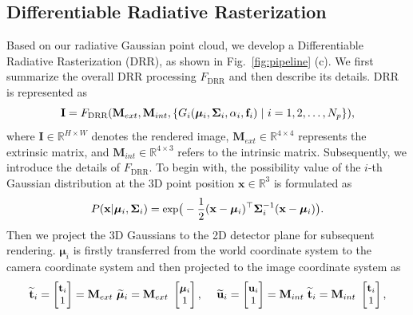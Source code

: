 \documentclass[runningheads]{llncs}
\begin{document}
\subsection{Differentiable Radiative Rasterization}
\vspace{-1mm}
Based on our radiative Gaussian point cloud, we develop a Differentiable Radiative Rasterization (DRR), as shown in Fig.~\ref{fig:pipeline} (c). We first summarize the overall DRR processing $F_{\text{DRR}}$ and then describe its details. DRR is represented as
\vspace{-0.3mm}
\begin{equation}
\small
\mathbf{I} = F_{\text{DRR}}(\mathbf{M}_{ext}, \mathbf{M}_{int}, \{G_i(\bm{\mu}_i, \mathbf{\Sigma}_i, \alpha_i, \mathbf{f}_i)~|~{i = 1, 2, \dots, N_p}\}),
 \label{eq:drr}
\vspace{-0.4mm}
\end{equation}
where $\mathbf{I} \in \mathbb{R}^{H\times W}$ denotes the rendered image, $\mathbf{M}_{ext} \in \mathbb{R}^{4\times 4}$ represents the extrinsic matrix, and $\mathbf{M}_{int} \in \mathbb{R}^{4\times 3}$ refers to the intrinsic matrix. Subsequently, we introduce the details of $F_{\text{DRR}}$. To begin with, the possibility value of the $i$-th Gaussian distribution at the 3D point position $\mathbf{x} \in \mathbb{R}^3$ is formulated as
\vspace{-0.7mm}
\begin{equation}
	\small
	P(\mathbf{x}|\mathrm{\bm{\mu}}_i, \mathrm{\bf \Sigma}_i) = \text{exp}\big(-\frac{1}{2}(\mathbf{x} - \bm{\mu}_i)^\top \mathrm{\bf \Sigma}_i^{-1} (\mathbf{x} - \bm{\mu}_i)\big).
 \vspace{-0.7mm}
\end{equation}
Then we project the 3D Gaussians to the 2D detector plane for subsequent rendering.  $\bm{\mu}_i$ is firstly transferred from the world coordinate system to the camera coordinate system and then projected to the image coordinate system as
\vspace{-0.6mm}
\begin{equation}
	\small
	\widetilde{\mathbf{t}}_i = 
	\begin{bmatrix}
		\mathbf{t}_{i}\\
		1
	\end{bmatrix} = \mathbf{M}_{ext}~ \widetilde{\bm{\mu}}_i = \mathbf{M}_{ext}~
	\begin{bmatrix}
		\bm{\mu}_{i}\\
		1
	\end{bmatrix}, ~~~~
    \widetilde{\mathbf{u}}_i = 
	\begin{bmatrix}
		\mathbf{u}_{i}\\
		1
	\end{bmatrix} = \mathbf{M}_{int}~ \widetilde{\mathbf{t}}_i = \mathbf{M}_{int}~
	\begin{bmatrix}
		\mathbf{t}_{i}\\
		1
	\end{bmatrix},
 \vspace{-1mm}
\end{equation}
\end{document}
